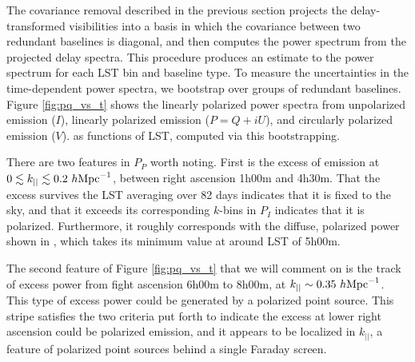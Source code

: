 The covariance removal described in the previous section projects the delay-transformed
visibilities into a basis in which the covariance between two redundant baselines is diagonal, and
then computes the power spectrum from the projected delay spectra. This procedure produces an
estimate to the power spectrum for each LST bin and baseline type. To measure the uncertainties in
the time-dependent power spectra, we bootstrap over groups of redundant baselines. Figure
\ref{fig:pq_vs_t} shows the linearly polarized power spectra from unpolarized emission ($I$),
linearly polarized emission ($P = Q+iU$), and circularly polarized emission ($V$). as functions of
LST, computed via this bootstrapping.

There are two features in $P_P$ worth noting. First is the excess of emission at $0 \lesssim k_{||}
\lesssim 0.2\ h{\rm Mpc}^{-1}$, between right ascension 1h00m and 4h30m. That the excess survives
the LST averaging over 82 days indicates that it is fixed to the sky, and that it exceeds its
corresponding $k$-bins in $P_I$ indicates that it is polarized. Furthermore, it roughly corresponds
with the diffuse, polarized power shown in \citet{Bernardi2013}, which takes its minimum value at 
around LST of 5h00m.

The second feature of Figure \ref{fig:pq_vs_t} that we will comment on is the track of excess power
from fight ascension 6h00m to 8h00m, at $k_{||} \sim 0.35\ h{\rm Mpc}^{-1}$. This type of excess
power could be generated by a polarized point source. This stripe satisfies the two criteria put forth to
indicate the excess at lower right ascension could be polarized emission, and it appears to be
localized in $k_{||}$, a feature of polarized point sources behind a single Faraday screen.

